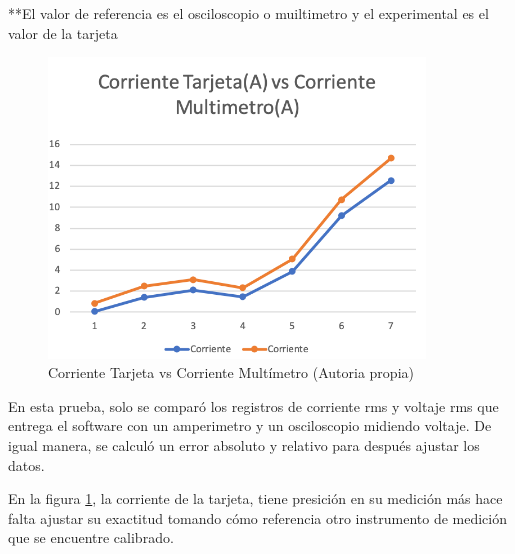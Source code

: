   **El valor de referencia es el osciloscopio o muiltimetro y el experimental es el valor de la tarjeta\\

  \begin{figure}[H]
    \begin{center}
        \includegraphics[width = 10cm]{4Resultados/prueba-1.png}
        \caption{ Corriente Tarjeta vs Corriente Multímetro (Autoria propia)} 
        \label{fig:prueba1}
   \end{center}
\end{figure}

En esta prueba, solo se comparó los registros de corriente rms y voltaje rms que entrega el software con un amperimetro y un osciloscopio midiendo voltaje.
 De igual manera, se calculó un error absoluto y relativo para después ajustar los datos.

 En la figura \ref{fig:prueba1}, la corriente de la tarjeta, tiene presición en su medición más hace falta ajustar su exactitud tomando cómo referencia otro instrumento de medición que se encuentre calibrado.

